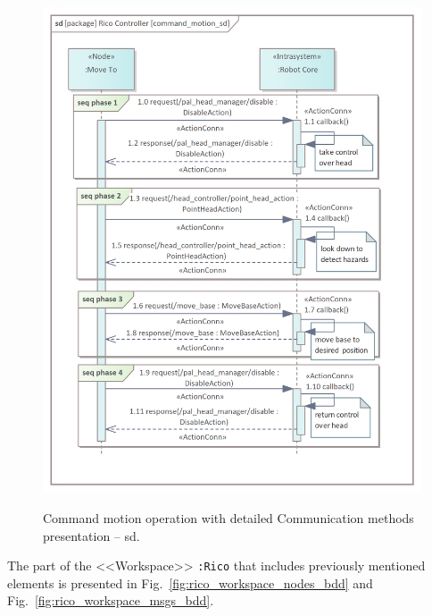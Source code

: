 \documentclass{ieeeaccess}
\begin{document}
	\begin{figure}[htb]
		\centering
		\begin{center}
			{\includegraphics[scale=0.7]{img/rico_pkg/command_motion_sd.png}}
		\end{center}
		\caption{Command motion operation with detailed Communication methods presentation -- sd.} 
		\label{fig:command_motion_sd}
	\end{figure}
	
	The part of the <<Workspace>> \texttt{:Rico} that includes previously mentioned elements is presented in Fig.~\ref{fig:rico_workspace_nodes_bdd} and Fig.~\ref{fig:rico_workspace_msgs_bdd}.
	
\end{document}
